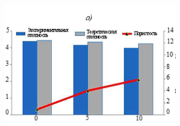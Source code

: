
\begin{figure}[H]
	\centering
	\includegraphics[width=0.8\textwidth]{media/chem/image6}
	\caption*{}
\end{figure}

